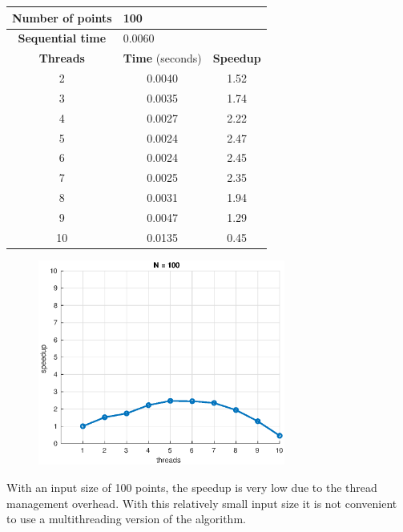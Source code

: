 \documentclass[10pt,twocolumn,letterpaper]{article}
\begin{document}
\begin{table}[H]
\begin{tabular}{c c c}
\hline
\textbf{Number of points} & \multicolumn{2}{l}{100} \\ 
\hline
\textbf{Sequential time} & \multicolumn{2}{l}{0.0060} \\
\hline
\textbf{Threads} & \textbf{Time} (seconds) & \textbf{Speedup} \\
\hline
2 & 0.0040 & 1.52 \\
3 & 0.0035 & 1.74 \\
4 & 0.0027 & 2.22 \\
5 & 0.0024 & 2.47 \\
6 & 0.0024 & 2.45 \\
7 & 0.0025 & 2.35 \\
8 & 0.0031 & 1.94 \\
9 & 0.0047 & 1.29 \\
10 & 0.0135 & 0.45 \\
\end{tabular}
\end{table}

\begin{figure}[H]
\centering
\includegraphics[width=3.2in]{fig/speedup100.eps}
\end{figure}

With an input size of 100 points, the speedup is very low due to the thread management overhead. With this relatively small input size it is not convenient to use a multithreading version of the algorithm.
\end{document}
